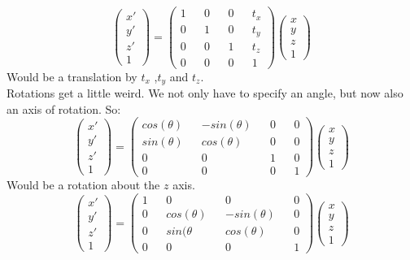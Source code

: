 \documentclass[12pt]{article}
\theoremstyle{definition}
\begin{document}
$$\begin{pmatrix}
x' \\ y' \\ z' \\ 1
\end{pmatrix}=
\begin{pmatrix}
1 && 0 && 0 && t_x \\
0 && 1 && 0 && t_y \\
0 && 0 && 1 && t_z \\
0 && 0 && 0 && 1
\end{pmatrix}
\begin{pmatrix}
	x \\ y \\ z \\ 1
\end{pmatrix}$$
Would be a translation by $t_x$ ,$t_y$ and $t_z$. 
\\ \linebreak
Rotations get a little weird. We not only have to specify an angle, but now also an axis of rotation. So:
$$\begin{pmatrix}
x' \\ y' \\ z' \\ 1
\end{pmatrix}=
\begin{pmatrix}
cos(\theta) && -sin(\theta) && 0 && 0 \\
sin(\theta) && cos(\theta)  && 0 && 0 \\
0           && 0            && 1 && 0 \\
0           && 0            && 0 && 1
\end{pmatrix}
\begin{pmatrix}
x \\ y \\ z \\ 1
\end{pmatrix}$$
Would be a rotation about the $z$ axis.
$$\begin{pmatrix}
x' \\ y' \\ z' \\ 1
\end{pmatrix}=
\begin{pmatrix}
1 && 0            && 0           && 0 \\
0 && cos(\theta)  && -sin(\theta)&& 0 \\
0 && sin(\theta   && cos(\theta) && 0 \\
0 && 0            && 0           && 1
\end{pmatrix}
\begin{pmatrix}
x \\ y \\ z \\ 1
\end{pmatrix}$$
\end{document}

